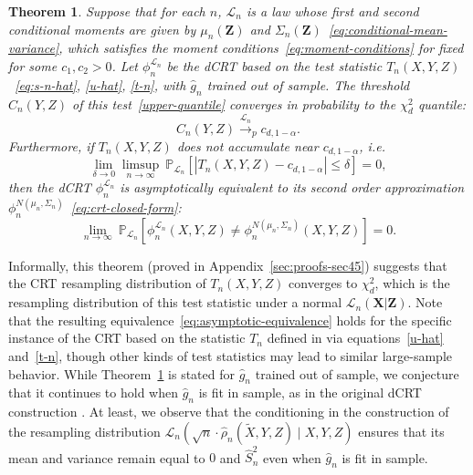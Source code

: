 \documentclass[ejs]{imsart}
\numberwithin{equation}{section}
\theoremstyle{plain}
\newtheorem{theorem}{Theorem}[section]
\theoremstyle{definition}
\theoremstyle{remark}
\newcommand{\prx}{\bm X}
\newcommand{\srx}{X}
\newcommand{\prz}{\bm Z}
\newcommand{\srz}{Z}
\newcommand{\srxk}{\widetilde X}
\newcommand{\sry}{Y}
\begin{document}
\begin{theorem} \label{thm:equivalence}
Suppose that for each $n$, $\mathcal L_n$ is a law whose first and second conditional moments are given by $\mu_n(\prz)$ and $\Sigma_n(\prz)$~\eqref{eq:conditional-mean-variance}, which satisfies the moment conditions~\eqref{eq:moment-conditions} for fixed for some $c_1, c_2 > 0$. Let $\phi_n^{\mathcal L_n}$ be the dCRT based on the test statistic $T_n(\srx, \sry, \srz)$~\eqref{eq:s-n-hat}, \eqref{u-hat}, \eqref{t-n}, with $\widehat g_n$ trained out of sample. The threshold $C_n(\sry, \srz)$ of this test~\eqref{upper-quantile} converges in probability to the $\chi^2_d$ quantile:
	\begin{equation}
		C_n(Y,Z) \overset{\mathcal L_n}\rightarrow_p c_{d,1-\alpha}.
		\label{eq:threshold-convergence}
	\end{equation}
	Furthermore, if $T_n(\srx, \sry, \srz)$ does not accumulate near $c_{d,1-\alpha}$, i.e.
	\begin{equation}
		\lim_{\delta \rightarrow 0}\limsup_{n \rightarrow \infty}\ \mathbb P_{\mathcal L_n}[|T_n(\srx, \sry, \srz)-c_{d,1-\alpha}| \leq \delta] = 0,
		\label{eq:non-accumulation}
	\end{equation}
	then the dCRT $\phi_n^{\mathcal L_n}$ is asymptotically equivalent to its second order approximation $\phi^{N(\mu_n, \Sigma_n)}_n$~\eqref{eq:crt-closed-form}:
	\begin{equation}
		\lim_{n \rightarrow \infty}\ \mathbb P_{\mathcal L_n}[\phi^{\mathcal L_n}_n(\srx, \sry, \srz) \neq \phi^{N(\mu_n, \Sigma_n)}_n(\srx, \sry, \srz)] = 0.
		\label{eq:asymptotic-equivalence}
	\end{equation}	
\end{theorem}

Informally, this theorem (proved in Appendix~\ref{sec:proofs-sec45}) suggests that the CRT resampling distribution of $T_n(\srx, \sry, \srz)$ converges to $\chi^2_d$, which is the resampling distribution of this test statistic under a normal $\mathcal L_n(\prx|\prz)$. Note that the resulting equivalence~\eqref{eq:asymptotic-equivalence} holds for the specific instance of the CRT based on the statistic $T_n$ defined in via equations~\eqref{u-hat} and~\eqref{t-n}, though other kinds of test statistics may lead to similar large-sample behavior. While Theorem~\ref{thm:equivalence} is stated for $\widehat g_n$ trained out of sample, we conjecture that it continues to hold when $\widehat g_n$ is fit in sample, as in the original dCRT construction \citep{Liu2020}. At least, we observe that the conditioning in the construction of the resampling distribution $\mathcal L_n(\sqrt n \cdot \widehat \rho_n(\srxk, \sry, \srz) \mid \srx, \sry, \srz)$ ensures that its mean and variance remain equal to $0$ and $\widehat S_n^2$ even when $\widehat g_n$ is fit in sample.
\end{document}
